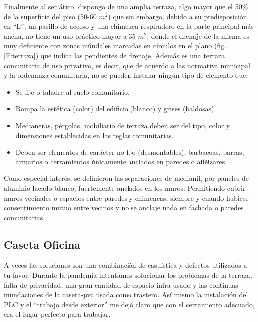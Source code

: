 Finalmente al ser ático, dispongo de una amplia terraza, algo mayor que el 50\% de la superficie del piso (50-60 {\rm$m^{2}$}) que sin embargo, debido a su predisposición en “L”, un pasillo de acceso y una chimenea-respiradero en la parte principal más ancha, no tiene un uso práctico mayor a 35 {\rm$m^{2}$}, donde el drenaje de la misma es muy deficiente con zonas inúndales marcadas en círculos en el plano (fig.\ref{F:terraza}) que indica las pendientes de drenaje. Además es una terraza comunitaria de uso privativo, es decir, que de acuerdo a las normativa municipal y la ordenanza comunitaria, no se pueden instalar ningún tipo de elemento que:
\begin{itemize}
    \item Se fije o taladre al suelo comunitario.
    \item Rompa la estética (color) del edificio (blanco) y grises (baldosas).
    \item Medianeras, pérgolas,  mobiliario de terraza deben ser del tipo, color y dimensiones establecidas en las reglas comunitarias.
    \item Deben ser elementos de carácter no fijo (desmontables), barbacoas, barras, armarios o cerramientos únicamente anclados en paredes o alféizares.
\end{itemize}

Como especial interés, se definieron las separaciones de medianil, por paneles de aluminio lacado blanco, fuertemente anclados en los muros. Permitiendo cubrir muros vecinales o espacios entre paredes y chimeneas, siempre y cuando hubiese consentimiento mutuo entre vecinos y no se anclaje nada en fachada o paredes comunitarias.

\subsection{Caseta Oficina}
A veces las soluciones son una combinación de casuística y defectos utilizados a tu favor. Durante la pandemia intentamos solucionar los problemas de la terraza, falta de privacidad, una gran cantidad de espacio infra usado y las continuas inundaciones de la caseta-pvc usada como trastero. Así mismo la instalación del PLC y el “trabajo desde exterior” me dejó claro que con el cerramiento adecuado, era el lugar perfecto para trabajar.

